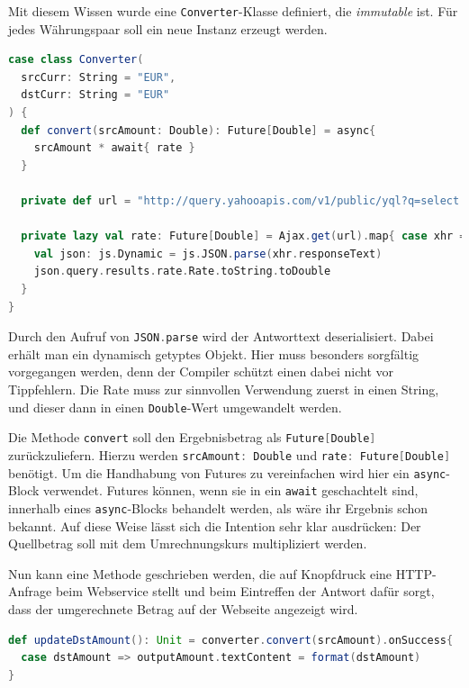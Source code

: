 \documentclass[a4paper, 12pt, hidelinks, listof=totoc, listoftables=totoc, bibliography=totoc]{scrreprt}
\newcommand{\scala}[1]{\lstinline[language=Scala, style=inline]|#1|}
\begin{document}
Mit diesem Wissen wurde eine \scala{Converter}-Klasse definiert, die \emph{immutable} ist. Für jedes Währungspaar soll ein neue Instanz erzeugt werden.

\pagebreak

\begin{lstlisting}[language=Scala, caption={Der Währungsumrechner.}, label={code:converter}]
case class Converter(
  srcCurr: String = "EUR",
  dstCurr: String = "EUR"
) {
  def convert(srcAmount: Double): Future[Double] = async{
    srcAmount * await{ rate }
  }

  private def url = "http://query.yahooapis.com/v1/public/yql?q=select * from yahoo.finance.xchange where pair in ('" + srcCurr + dstCurr + "')&format=json&env=store://datatables.org/alltableswithkeys"

  private lazy val rate: Future[Double] = Ajax.get(url).map{ case xhr =>
    val json: js.Dynamic = js.JSON.parse(xhr.responseText)
    json.query.results.rate.Rate.toString.toDouble
  }
}
\end{lstlisting}

Durch den Aufruf von \scala{JSON.parse} wird der Antworttext deserialisiert. Dabei erhält man ein dynamisch getyptes Objekt. Hier muss besonders sorgfältig vorgegangen werden, denn der Compiler schützt einen dabei nicht vor Tippfehlern. Die Rate muss zur sinnvollen Verwendung zuerst in einen String, und dieser dann in einen \scala{Double}-Wert umgewandelt werden.

Die Methode \scala{convert} soll den Ergebnisbetrag als \scala{Future[Double]} zurückzuliefern. Hierzu werden \scala{srcAmount: Double} und \scala{rate: Future[Double]} benötigt. Um die Handhabung von Futures zu vereinfachen wird hier ein \scala{async}-Block verwendet. Futures können, wenn sie in ein \scala{await} geschachtelt sind, innerhalb eines \scala{async}-Blocks behandelt werden, als wäre ihr Ergebnis schon bekannt. Auf diese Weise lässt sich die Intention sehr klar ausdrücken: Der Quellbetrag soll mit dem Umrechnungskurs multipliziert werden.

Nun kann eine Methode geschrieben werden, die auf Knopfdruck eine \ac{HTTP}-Anfrage beim Webservice stellt und beim Eintreffen der Antwort dafür sorgt, dass der umgerechnete Betrag auf der Webseite angezeigt wird.

\begin{lstlisting}[language=Scala, style=snippet]
def updateDstAmount(): Unit = converter.convert(srcAmount).onSuccess{
  case dstAmount => outputAmount.textContent = format(dstAmount)
}
\end{lstlisting}
\end{document}
